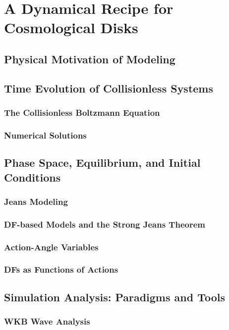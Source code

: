 \chapter{A Dynamical Recipe for Cosmological Disks}\label{ch:Background}

\section{Physical Motivation of Modeling}

\section{Time Evolution of Collisionless Systems}
\subsection{The Collisionless Boltzmann Equation}
\subsection{Numerical Solutions}

\section{Phase Space, Equilibrium, and Initial Conditions}
\subsection{Jeans Modeling}
\subsection{DF-based Models and the Strong Jeans Theorem}
\subsection{Action-Angle Variables}
\subsection{DFs as Functions of Actions}

\section{Simulation Analysis: Paradigms and Tools}
\subsection{WKB Wave Analysis}
